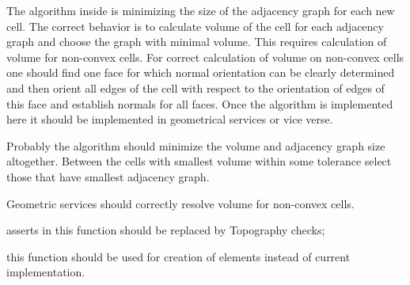 \begin{DoxyRefList}
\begin{DoxyEnumerate}
\end{DoxyEnumerate}
\item[\label{todo__todo000005}%
\hypertarget{todo__todo000005}{}%
Member \hyperlink{classINMOST_1_1Cell_afd127d2e41a4b4362dc3399d9ac96a59}{I\-N\-M\-O\-S\-T\-:\-:Cell\-:\-:Split\-Cell} (Cell cell, const Element\-Array$<$ Face $>$ \&faces, Marker\-Type del\-\_\-protect)]
\begin{DoxyEnumerate}
\item The algorithm inside is minimizing the size of the adjacency graph for each new cell. The correct behavior is to calculate volume of the cell for each adjacency graph and choose the graph with minimal volume. This requires calculation of volume for non-\/convex cells. For correct calculation of volume on non-\/convex cells one should find one face for which normal orientation can be clearly determined and then orient all edges of the cell with respect to the orientation of edges of this face and establish normals for all faces. Once the algorithm is implemented here it should be implemented in geometrical services or vice verse.
\item Probably the algorithm should minimize the volume and adjacency graph size altogether. Between the cells with smallest volume within some tolerance select those that have smallest adjacency graph.  
\end{DoxyEnumerate}
\item[\label{todo__todo000007}%
\hypertarget{todo__todo000007}{}%
Member \hyperlink{classINMOST_1_1Cell_ae0caec87803ddd108c4fb06decf69e18}{I\-N\-M\-O\-S\-T\-:\-:Cell\-:\-:Volume} () const ]
\begin{DoxyEnumerate}
\item Geometric services should correctly resolve volume for non-\/convex cells.  
\end{DoxyEnumerate}
\item[\label{todo__todo000001}%
\hypertarget{todo__todo000001}{}%
Member \hyperlink{classINMOST_1_1Element_a96bd136b0f249c958fc8632553aa3b58}{I\-N\-M\-O\-S\-T\-:\-:Element\-:\-:Connect} (const Handle\-Type $\ast$adjacent, I\-N\-M\-O\-S\-T\-\_\-\-D\-A\-T\-A\-\_\-\-E\-N\-U\-M\-\_\-\-T\-Y\-P\-E num) const ]
\begin{DoxyEnumerate}
\item asserts in this function should be replaced by Topography checks; \par

\item this function should be used for creation of elements instead of current implementation. \par


\end{DoxyEnumerate}
\end{DoxyRefList}

